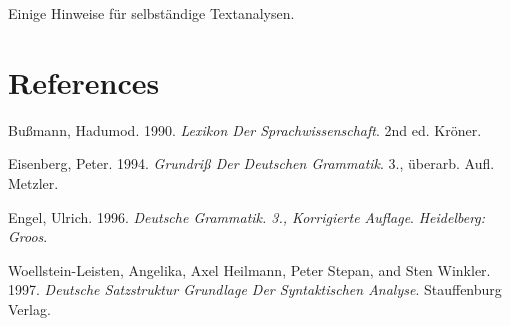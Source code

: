 \documentclass[
  letterpaper,
  DIV=11,
  numbers=noendperiod]{scrreprt}
\newlength{\cslhangindent}
\newlength{\cslentryspacingunit} %
\newenvironment{CSLReferences}[2] %
 {%
  \setlength{\parindent}{0pt}
  \ifodd #1
  \let\oldpar\par
  \def\par{\hangindent=\cslhangindent\oldpar}
  \fi
  \setlength{\parskip}{#2\cslentryspacingunit}
 }%
 {}
\begin{document}
Einige Hinweise für selbständige Textanalysen.


\hypertarget{references}{%
\chapter*{References}\label{references}}

\hypertarget{refs}{}
\begin{CSLReferences}{1}{0}
\leavevmode{}%
Bußmann, Hadumod. 1990. \emph{Lexikon Der Sprachwissenschaft}. 2nd ed.
Kr{ö}ner.

\leavevmode{}%
Eisenberg, Peter. 1994. \emph{Grundri{ß} Der Deutschen Grammatik}. 3.,
überarb. Aufl. Metzler.

\leavevmode{}%
Engel, Ulrich. 1996. \emph{Deutsche Grammatik. 3., Korrigierte Auflage}.
\emph{Heidelberg: Groos}.

\leavevmode{}%
Woellstein-Leisten, Angelika, Axel Heilmann, Peter Stepan, and Sten
Winkler. 1997. \emph{Deutsche Satzstruktur Grundlage Der Syntaktischen
Analyse}. Stauffenburg Verlag.

\end{CSLReferences}



\printindex
\end{document}
